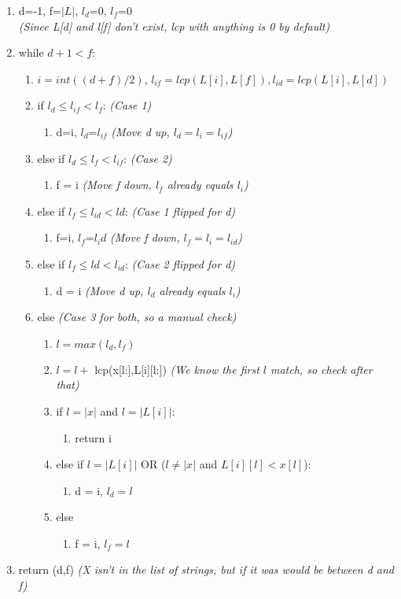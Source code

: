 \begin{enumerate}[label=\Alph*]
    \item d=-1, f=$|L|$, $l_d$=0, $l_f$=0 \\ \emph{(Since L[d] and l[f] don't exist, lcp with anything is 0 by default)}
    \item while $d+1<f$:
\begin{enumerate}[label=\arabic*]
    \item \(i = int((d+f)/2)\), \( l_{if} = lcp(L[i],L[f]), l_{id} = lcp(L[i],L[d])  \)
    \item if \(l_d \leq l_{if} < l_f\): \emph{(Case 1)}
 \begin{enumerate}
    \item [] d=i, $l_d$=$l_{if}$ \emph{(Move d up, $l_d=l_i=l_{if}$)}
\end{enumerate} 
    \item [] else if \(l_d \leq l_f < l_{if}\): \emph{(Case 2)}
 \begin{enumerate}
    \item [] f = i \emph{(Move f down, $l_f$ already equals $l_i$)}
\end{enumerate} 
    \item [] else if \(l_f \leq l_{id} < ld\): \emph{(Case 1 flipped for d)}
 \begin{enumerate}
    \item [] f=i, $l_f$=$l_id$ \emph{(Move f down, $l_f=l_i=l_{id}$)}
\end{enumerate} 
    \item [] else if \(l_f \leq ld < l_{id}\): \emph{(Case 2 flipped for d)}
 \begin{enumerate}
    \item [] d = i \emph{(Move d up, $l_d$ already equals $l_i$)}
\end{enumerate} 
    \item [] else \emph{(Case 3 for both, so a manual check)}
 \begin{enumerate}
    \item $l = max(l_d,l_f)$ 
    \item $l = l +$ lcp(x[l:],L[i][l:]) \emph{(We know the first $l$ match, so check after that)}
    \item if $l= |x|$ and $l= |L[i]|$:
 \begin{enumerate}
    \item [] return i 
\end{enumerate} 
    \item [] else if $l= |L[i]|$ OR ($l\neq |x|$ and $L[i][l] < x[l]$):
 \begin{enumerate}
    \item [] d = i, $l_d=l$
\end{enumerate} 
    \item [] else 
 \begin{enumerate}
    \item [] f = i, $l_f=l$ 
\end{enumerate} 
\end{enumerate} 
\end{enumerate}  
\item return (d,f) \emph{(X isn't in the list of strings, but if it was would be between d and f)}
\end{enumerate}